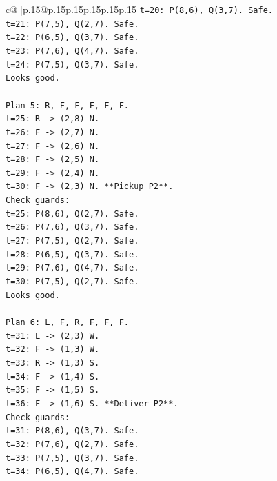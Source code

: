\documentclass{article}
\begin{document}
{\begin{supertabular}{c@{$\;$}|p{.15\linewidth}@{}p{.15\linewidth}p{.15\linewidth}p{.15\linewidth}p{.15\linewidth}p{.15\linewidth}}
{{{\texttt{t=20: P(8,6), Q(3,7). Safe.} \\
\texttt{t=21: P(7,5), Q(2,7). Safe.} \\
\texttt{t=22: P(6,5), Q(3,7). Safe.} \\
\texttt{t=23: P(7,6), Q(4,7). Safe.} \\
\texttt{t=24: P(7,5), Q(3,7). Safe.} \\
\texttt{Looks good.} \\
\\ 
\texttt{Plan 5: R, F, F, F, F, F.} \\
\texttt{t=25: R {-}> (2,8) N.} \\
\texttt{t=26: F {-}> (2,7) N.} \\
\texttt{t=27: F {-}> (2,6) N.} \\
\texttt{t=28: F {-}> (2,5) N.} \\
\texttt{t=29: F {-}> (2,4) N.} \\
\texttt{t=30: F {-}> (2,3) N. **Pickup P2**.} \\
\texttt{Check guards:} \\
\texttt{t=25: P(8,6), Q(2,7). Safe.} \\
\texttt{t=26: P(7,6), Q(3,7). Safe.} \\
\texttt{t=27: P(7,5), Q(2,7). Safe.} \\
\texttt{t=28: P(6,5), Q(3,7). Safe.} \\
\texttt{t=29: P(7,6), Q(4,7). Safe.} \\
\texttt{t=30: P(7,5), Q(2,7). Safe.} \\
\texttt{Looks good.} \\
\\ 
\texttt{Plan 6: L, F, R, F, F, F.} \\
\texttt{t=31: L {-}> (2,3) W.} \\
\texttt{t=32: F {-}> (1,3) W.} \\
\texttt{t=33: R {-}> (1,3) S.} \\
\texttt{t=34: F {-}> (1,4) S.} \\
\texttt{t=35: F {-}> (1,5) S.} \\
\texttt{t=36: F {-}> (1,6) S. **Deliver P2**.} \\
\texttt{Check guards:} \\
\texttt{t=31: P(8,6), Q(3,7). Safe.} \\
\texttt{t=32: P(7,6), Q(2,7). Safe.} \\
\texttt{t=33: P(7,5), Q(3,7). Safe.} \\
\texttt{t=34: P(6,5), Q(4,7). Safe.} \\
}}}
\end{supertabular}}
\end{document}
